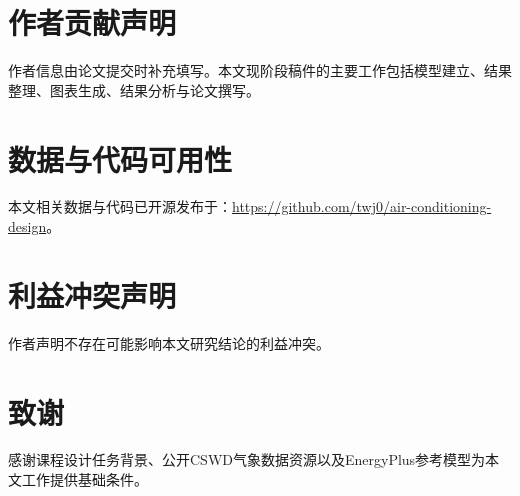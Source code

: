 \section*{作者贡献声明}

作者信息由论文提交时补充填写。本文现阶段稿件的主要工作包括模型建立、结果整理、图表生成、结果分析与论文撰写。

\section*{数据与代码可用性}

本文相关数据与代码已开源发布于：\url{https://github.com/twj0/air-conditioning-design}。

\section*{利益冲突声明}

作者声明不存在可能影响本文研究结论的利益冲突。

\section*{致谢}

感谢课程设计任务背景、公开CSWD气象数据资源以及EnergyPlus参考模型为本文工作提供基础条件。
